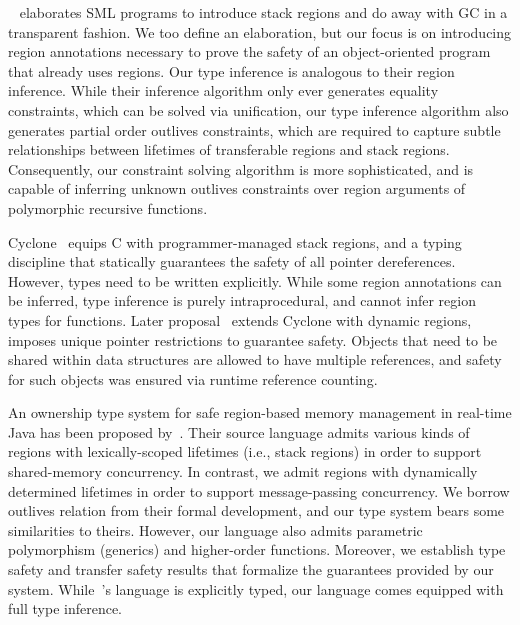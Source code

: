 ~\cite{tofte97} elaborates SML programs to introduce stack regions and
do away with GC in a transparent fashion. We too define an
elaboration, but our focus is on introducing region annotations
necessary to prove the safety of an object-oriented program that
already uses regions.
Our type inference is analogous to their region inference. While their
inference algorithm only ever generates equality constraints, which
can be solved via unification, our type inference algorithm also
generates partial order outlives constraints, which are required to
capture subtle relationships between lifetimes of transferable regions
and stack regions. Consequently, our constraint solving algorithm is
more sophisticated, and is capable of inferring unknown outlives
constraints over region arguments of polymorphic recursive functions.

Cyclone~\cite{cyclone02} equips C with programmer-managed stack
regions, and a typing discipline that statically guarantees the safety
of all pointer dereferences. However, types need to be written
explicitly. While some region annotations can be inferred, type
inference is purely intraprocedural, and cannot infer region types for
functions. Later proposal~\cite{cyclone04} extends Cyclone with
dynamic regions, imposes unique pointer restrictions to guarantee
safety. Objects that need to be shared within data structures are
allowed to have multiple references, and safety for such objects was
ensured via runtime reference counting.

An ownership type system for safe region-based memory management in
real-time Java has been proposed by~\cite{MIT03}.  
Their source language admits various kinds of regions with
lexically-scoped lifetimes (i.e., stack regions) in order to support
shared-memory concurrency. In contrast, we admit regions with
dynamically determined lifetimes in order to support message-passing
concurrency. We borrow outlives relation from their formal
development, and our type system bears some similarities to theirs.
However, our language also admits parametric polymorphism (generics)
and higher-order functions.
Moreover, we establish type safety and transfer safety results that
formalize the guarantees provided by our system. While~\cite{MIT03}'s
language is explicitly typed, our language comes equipped with full
type inference.

